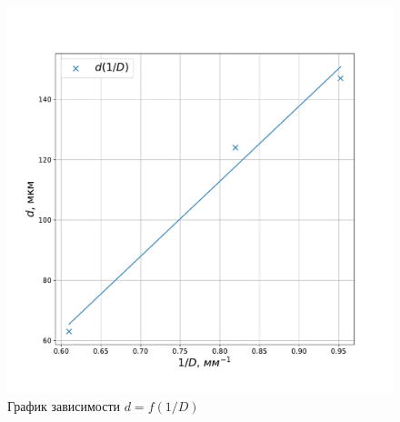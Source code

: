 \documentclass[a4paper, 12pt]{article}
\begin{document}
\begin{figure}[!h]
	\centering
	\includegraphics[scale = 0.4]{graph1}
	\caption{График зависимости $d = f \left( 1 / D \right)$}
	\label{graph1}
\end{figure}
\end{document}
